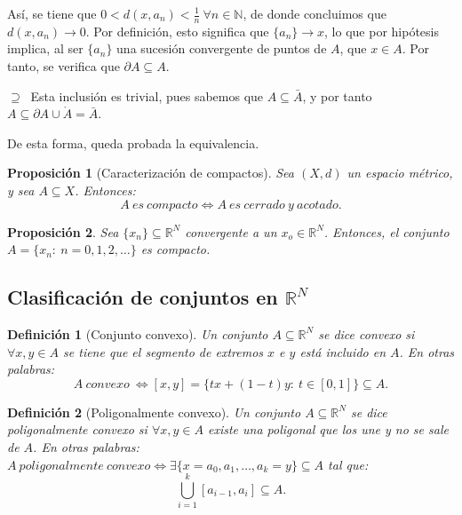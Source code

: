 \documentclass[11pt, a4paper, titlepage]{article}
\makeatletter
\renewenvironment{proof}[1][\proofname] {\vspace{-15pt}\par\pushQED{\qed}\normalfont\topsep6\p@\@plus6\p@\relax\trivlist\item[\hskip\labelsep\it#1\@addpunct{.}]\ignorespaces}{\popQED\endtrivlist\@endpefalse}
\theoremstyle{theorem-style}
\newtheorem*{nprop}{Proposición}
\theoremstyle{definition-style}
\newtheorem*{ndef}{Definición}
\theoremstyle{remark-style}
\theoremstyle{example-style}
\makeatother
\begin{document}
\begin{proof}
\begin{description}
Así, se tiene que $0 < d(x,a_n) < \frac{1}{n}\ \forall n\in \mathbb{N}$, de donde concluimos que $d(x,a_n) \rightarrow 0$. Por definición, esto significa que $\{a_n\} \rightarrow x$, lo que por hipótesis implica, al ser $\{a_n\}$ una sucesión convergente de puntos de $A$, que  $x\in A$. Por tanto, se verifica que $\partial A \subseteq A$.

\item $\displaystyle \boxed{\supseteq}\ $ Esta inclusión es trivial, pues sabemos que $A \subseteq \bar{A}$, y por tanto $A \subseteq \partial A \cup \mathring{A} = \bar{A}$.
\end{description}

De esta forma, queda probada la equivalencia.
\end{proof}



\begin{nprop}[Caracterización de compactos]
Sea $(X,d)$ un espacio métrico, y sea $A \subseteq X$. Entonces: $$A\ es\ compacto \iff A\ es\ cerrado\ y\ acotado.$$
\end{nprop}



\begin{nprop}
Sea $\{x_n\} \subseteq \mathbb{R}^N$ convergente a un $x_o \in \mathbb{R}^N$. Entonces, el conjunto \hfill \\$A = \{x_n:\ n=0,1,2,\dots \}$ es compacto.
\end{nprop}



\subsection{Clasificación de conjuntos en $\mathbb{R}^N$}

\begin{ndef}[Conjunto convexo]
Un conjunto $A\subseteq \mathbb{R}^N$ se dice \textit{convexo} si $\forall x,y \in A$ se tiene que el segmento de extremos $x$ e $y$ está incluido en $A$. En otras palabras: $$A\ convexo\ \iff [x,y] = \{tx + (1-t)y: \ t\in [0,1]\} \subseteq A.$$
\end{ndef}



\begin{ndef}[Poligonalmente convexo]
Un conjunto $A\subseteq \mathbb{R}^N$ se dice \textit{poligonalmente convexo} si  $\forall x,y \in A$ existe una poligonal que los une y no se sale de $A$. En otras palabras:  $A\ poligonalmente\ convexo \iff \exists \{x= a_0, a_1,\dots,a_k=y \}\subseteq A$ tal que: $$\bigcup_{i=1}^k [a_{i-1},a_i] \subseteq A.$$
\end{ndef}
\end{document}
